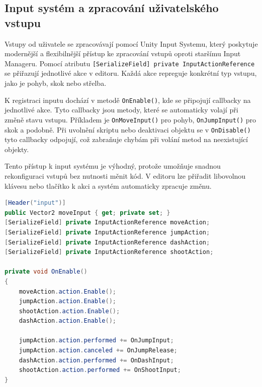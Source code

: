 \subsection{Input systém a zpracování uživatelského vstupu}

Vstupy od uživatele se zpracovávají pomocí Unity Input Systemu, který poskytuje modernější a flexibilnější přístup ke zpracování vstupů oproti staršímu Input Manageru. Pomocí atributu \texttt{[SerializeField] private InputActionReference} se přiřazují jednotlivé akce v editoru. Každá akce repreguje konkrétní typ vstupu, jako je pohyb, skok nebo střelba.

K registraci inputu dochází v metodě \texttt{OnEnable()}, kde se připojují callbacky na jednotlivé akce. Tyto callbacky jsou metody, které se automaticky volají při změně stavu vstupu. Příkladem je \texttt{OnMoveInput()} pro pohyb, \texttt{OnJumpInput()} pro skok a podobně. Při uvolnění skriptu nebo deaktivaci objektu se v \texttt{OnDisable()} tyto callbacky odpojují, což zabraňuje chybám při volání metod na neexistující objekty.

Tento přístup k input systému je výhodný, protože umožňuje snadnou rekonfiguraci vstupů bez nutnosti měnit kód. V editoru lze přiřadit libovolnou klávesu nebo tlačítko k akci a systém automaticky zpracuje změnu.

\begin{lstlisting}[language=csharp,caption={Listing 3: Deklarace vstupních akcí}]
[Header("input")]
public Vector2 moveInput { get; private set; }
[SerializeField] private InputActionReference moveAction;
[SerializeField] private InputActionReference jumpAction;
[SerializeField] private InputActionReference dashAction;
[SerializeField] private InputActionReference shootAction;

private void OnEnable()
{
    moveAction.action.Enable();
    jumpAction.action.Enable();
    shootAction.action.Enable();
    dashAction.action.Enable();

    jumpAction.action.performed += OnJumpInput;
    jumpAction.action.canceled += OnJumpRelease;
    dashAction.action.performed += OnDashInput;
    shootAction.action.performed += OnShootInput;
}
\end{lstlisting}
